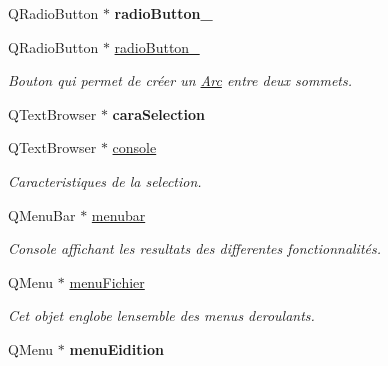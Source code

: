 \begin{DoxyCompactItemize}
Q\+Radio\+Button $\ast$ {\bfseries radio\+Button\+\_}
\item 
\mbox{\label{classUi__MainWindow_a6564e79a0da4de330ddfb8be069cb268}} 
Q\+Radio\+Button $\ast$ \hyperlink{classUi__MainWindow_a6564e79a0da4de330ddfb8be069cb268}{radio\+Button\+\_}
\begin{DoxyCompactList}\small\item\em Bouton qui permet de cr\'{e}er un \hyperlink{classArc}{Arc} entre deux sommets. \end{DoxyCompactList}\item 
\mbox{\label{classUi__MainWindow_a3f6b83c043b5e552cbf527d034e28426}} 
Q\+Text\+Browser $\ast$ {\bfseries cara\+Selection}
\item 
\mbox{\label{classUi__MainWindow_a4e6324fd3e2f723259626db497a285e4}} 
Q\+Text\+Browser $\ast$ \hyperlink{classUi__MainWindow_a4e6324fd3e2f723259626db497a285e4}{console}
\begin{DoxyCompactList}\small\item\em Caracteristiques de la selection. \end{DoxyCompactList}\item 
\mbox{\label{classUi__MainWindow_a734b1d3bb71c1b8e1ea01b7fa4344fce}} 
Q\+Menu\+Bar $\ast$ \hyperlink{classUi__MainWindow_a734b1d3bb71c1b8e1ea01b7fa4344fce}{menubar}
\begin{DoxyCompactList}\small\item\em Console affichant les resultats des differentes fonctionnalit\'{e}s. \end{DoxyCompactList}\item 
Q\+Menu $\ast$ \hyperlink{classUi__MainWindow_a7ab5b88372fc7887d782937113c0ebbb}{menu\+Fichier}
\begin{DoxyCompactList}\small\item\em Cet objet englobe l\textquotesingle{}ensemble des menus deroulants. \end{DoxyCompactList}\item 
\mbox{\label{classUi__MainWindow_a82dd03714b5aecd6307ab3d065b0e9c6}} 
Q\+Menu $\ast$ {\bfseries menu\+Eidition}
\item 
\mbox{\label{classUi__MainWindow_a1aaf528d5241537c401c0394be76a0a6}} 

\end{DoxyCompactItemize}
